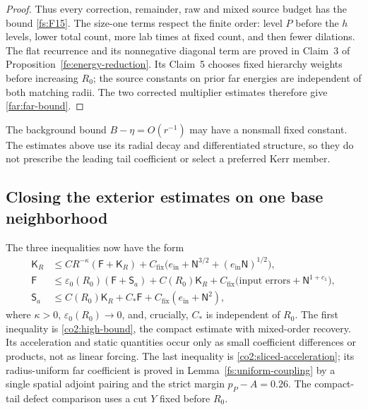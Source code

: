 \begin{proof}
Thus every correction, remainder, raw and mixed source budget has the
bound \eqref{fs:F15}.  The size-one terms respect the finite order:
level $P$ before the $h$ levels, lower total count, more lab times at
fixed count, and then fewer dilations.  The flat recurrence and its
nonnegative diagonal term are proved in Claim~3 of
Proposition~\ref{fe:energy-reduction}.  Its Claim~5 chooses fixed
hierarchy weights before increasing $R_0$; the source constants on
prior far energies are independent of both matching radii.
The two corrected multiplier estimates therefore give
\eqref{far:far-bound}.
\end{proof}

The background bound $B-\eta=O(r^{-1})$ may have a nonsmall fixed
constant.  The estimates above use its radial decay and differentiated
structure, so they do not prescribe the leading tail coefficient or
select a preferred Kerr member.

\subsection{Closing the exterior estimates on one base neighborhood}

The three inequalities now have the form
\begin{align}
 \mathsf K_R
 &\le CR^{-\kappa}(\mathsf F+\mathsf K_R)
    +C_{\mathrm{fix}}\bigl(e_{\mathrm{in}}+\mathsf N^{3/2}
                        +(e_{\mathrm{in}}\mathsf N)^{1/2}\bigr),
                                                   \label{far:compact-coupling}\\
 \mathsf F
 &\le\varepsilon_0(R_0)(\mathsf F+\mathsf S_a)
          +C(R_0)\mathsf K_R
          +C_{\mathrm{fix}}\bigl(\text{input errors}
                                      +\mathsf N^{1+c_1}\bigr),
                                                   \label{far:far-coupling}\\
 \mathsf S_a
 &\le C(R_0)\mathsf K_R+C_*\mathsf F
                   +C_{\mathrm{fix}}(e_{\mathrm{in}}+\mathsf N^2),
                                                   \label{far:sliced-coupling}
\end{align}
where $\kappa>0$, $\varepsilon_0(R_0)\to0$, and, crucially, $C_*$ is
independent of $R_0$.  The first inequality is \eqref{co2:high-bound}, the compact estimate with
mixed-order recovery.  Its acceleration and static quantities occur
only as small coefficient differences or products, not as linear
forcing.  The last inequality is \eqref{co2:sliced-acceleration}; its
radius-uniform far coefficient is proved in
Lemma~\ref{fs:uniform-coupling} by a single spatial adjoint pairing
and the strict margin $p_P-A=0.26$.  The compact-tail defect
comparison uses a cut $Y$ fixed before $R_0$.

